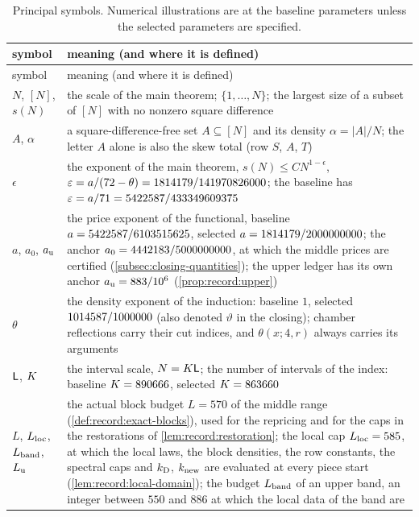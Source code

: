 \begingroup
\small
\setlength{\LTpre}{6pt}\setlength{\LTpost}{6pt}
\begin{longtable}{@{}>{\raggedright\arraybackslash}p{}%
>{\raggedright\arraybackslash}p{}@{}}
\caption{Principal symbols. Numerical illustrations are at the baseline
parameters unless the selected parameters are specified.}\label{tab:notation}\\
\toprule
symbol & meaning (and where it is defined)\\
\midrule
\endfirsthead
\toprule
symbol & meaning (and where it is defined)\\
\midrule
\endhead
\bottomrule
\endfoot
$N$, $[N]$, $s(N)$ & the scale of the main theorem; $\{1,\dots,N\}$; the
 largest size of a subset of $[N]$ with no nonzero square difference\\
$A$, $\alpha$ & a square-difference-free set $A\subseteq[N]$ and its density
 $\alpha=|A|/N$; the letter $A$ alone is also the skew total (row $S$, $A$,
 $T$)\\
$\epsilon$ & the exponent of the main theorem, $s(N)\le CN^{1-\epsilon}$,
 $\varepsilon=a/(72-\theta)=1814179/141970826000$; the baseline has
 $\varepsilon=a/71=5422587/433349609375$\\
$a$, $a_0$, $a_{\rm u}$ & the price exponent of the functional,
 baseline $a=5422587/6103515625$, selected $a=1814179/2000000000$; the anchor $a_0=4442183/5000000000$, at
 which the middle prices are certified (\cref{subsec:closing-quantities}); the
 upper ledger has its own anchor $a_{\rm u}=883/10^6$
 (\cref{prop:record:upper})\\
$\theta$ & the density exponent of the induction: baseline $1$, selected
 $1014587/1000000$ (also denoted $\vartheta$ in the closing);
 chamber reflections carry their cut indices, and $\theta(x;4,r)$
 always carries its arguments\\
$\mathsf L$, $K$ & the interval scale, $N=K\mathsf L$; the number of intervals
 of the index: baseline $K=890666$, selected $K=863660$\\
$L$, $L_{\rm loc}$, $L_{\rm band}$, $L_{\rm u}$ & the actual block budget
 $L=570$ of the middle range (\cref{def:record:exact-blocks}), used for the
 repricing and for the caps in the restorations of \cref{lem:record:restoration}; the local cap $L_{\rm loc}=585$, at which
 the local laws, the block densities, the row constants, the spectral caps and
 $k_{\rm D}$, $k_{\rm new}$ are evaluated at every piece start
 (\cref{lem:record:local-domain}); the budget $L_{\rm band}$ of an upper band,
 an integer between $550$ and $886$ at which the local data of the band are

\end{longtable}
